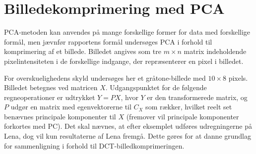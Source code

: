 \section{Billedekomprimering med PCA}
PCA-metoden kan anvendes på mange forskellige former for data med forskellige formål, men jævnfør rapportens formål undersøges PCA i forhold til komprimering af et billede. Billedet angives som tre $m \times n$ matrix indeholdende pixelintensiteten i de forskellige indgange, der repræsenterer en pixel i billedet.

For overskuelighedens skyld undersøges her et gråtone-billede med $10 \times 8$ pixels. Billedet betegnes ved matricen $X$. Udgangspunktet for de følgende regneoperationer er udtrykket $Y = PX$, hvor $Y$ er den transformerede matrix, og $P$ udgør en matrix med egenvektorerne til $C_X$ som rækker, hvilket reelt set benævnes principale komponenter til $X$ (fremover vil principale komponenter forkortes med PC). Det skal nævnes, at efter eksemplet udføres udregningerne på Lena, dog vil kun resultaterne af Lena fremgå. Dette gøres for at danne grundlag for sammenligning i forhold til DCT-billedkomprimeringen.
